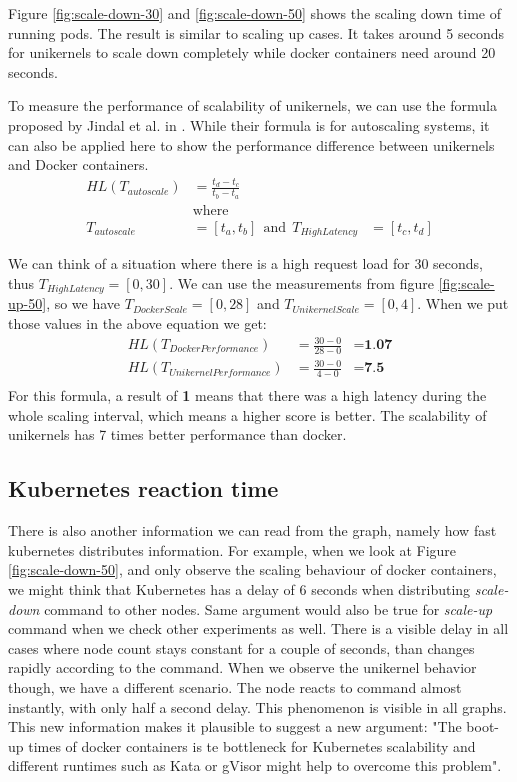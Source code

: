 Figure \ref{fig:scale-down-30} and \ref{fig:scale-down-50} shows the scaling down time of running pods. The result is similar to scaling up cases. It takes around 5 seconds for unikernels to scale down completely while docker containers need around 20 seconds. 

To measure the performance of scalability of unikernels, we can use the formula proposed by Jindal et al. in \cite{multilayered}. While their formula is for autoscaling systems, it can also be applied here to show the performance difference between unikernels and Docker containers.
\begin{equation*}
  \begin{aligned}
  HL(T_{autoscale})&=\frac{t_d-t_c}{t_b-t_a} \\
  &\textrm{where} \\ 
  T_{autoscale}&=[t_a,t_b] \ \ \textrm{and} \ \ T_{HighLatency}&=[t_c,t_d]
  \end{aligned}
\end{equation*}

We can think of a situation where there is a high request load for 30 seconds, thus \(T_{HighLatency}=[0,30]\). We can use the measurements from figure \ref{fig:scale-up-50}, so we have \(T_{DockerScale}=[0,28]\) and \(T_{UnikernelScale}=[0,4]\). When we put those values in the above equation we get:
\begin{equation*}
  \begin{aligned}
  HL(T_{DockerPerformance})&=\frac{30-0}{28-0}&=\textbf{1.07} \\
  HL(T_{UnikernelPerformance})&=\frac{30-0}{4-0}&=\textbf{7.5} \\
  \end{aligned}
\end{equation*}
For this formula, a result of \textbf{1} means that there was a high latency during the whole scaling interval, which means a higher score is better. The scalability of unikernels has 7 times better performance than docker.


\subsection{Kubernetes reaction time}
There is also another information we can read from the graph, namely how fast kubernetes distributes information. For example, when we look at Figure \ref{fig:scale-down-50}, and only observe the scaling behaviour of docker containers, we might think that Kubernetes has a delay of 6 seconds when distributing \textit{scale-down} command to other nodes. Same argument would also be true for \textit{scale-up} command when we check other experiments as well. There is a visible delay in all cases where node count stays constant for a couple of seconds, than changes rapidly according to the command. When we observe the unikernel behavior though, we have a different scenario. The node reacts to command almost instantly, with only half a second delay. This phenomenon is visible in all graphs. This new information makes it plausible to suggest a new argument: "The boot-up times of docker containers is te bottleneck for Kubernetes scalability and different runtimes such as Kata or gVisor might help to overcome this problem".

